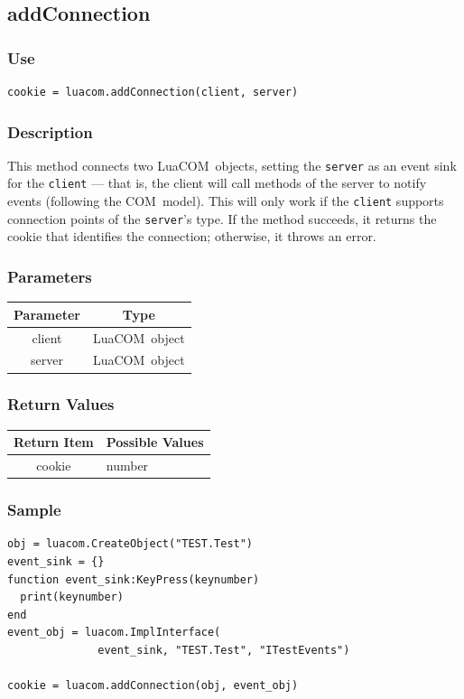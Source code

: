 \documentclass[11pt,a4paper,english]{report}
\newcommand{\ident}[1]{\mbox{\texttt{#1}}}
\newcommand{\techname}[1]{\mbox{#1}}
\newcommand{\com}{\techname{COM}}
\newcommand{\luacom}{\techname{LuaCOM}}
\begin{document}
\subsection*{addConnection}

\subsubsection*{Use}

\begin{verbatim}
cookie = luacom.addConnection(client, server)
\end{verbatim}

\subsubsection*{Description}
This method connects two \luacom\ objects, setting the
\ident{server} as an event sink for the \ident{client} --- that is, the
client will call methods of the server to notify events (following the
\com\ model). This will only work if the \ident{client} supports
connection points of the \ident{server}'s type. If the method
succeeds, it returns the cookie that identifies the connection;
otherwise, it throws an error.

\subsubsection*{Parameters}

\begin{tabular}{|c|c|}
\hline
\bf Parameter & \bf Type  \\ \hline \hline
client & \luacom\ object  \\ \hline
server & \luacom\ object  \\ \hline
\end{tabular}

\subsubsection*{Return Values}

\begin{tabular}{|c|p{4cm}|}
\hline
\bf Return Item & \bf Possible Values \\ \hline \hline
cookie  & number \\ \hline
\end{tabular}

\subsubsection*{Sample}
\begin{verbatim}
obj = luacom.CreateObject("TEST.Test")
event_sink = {}
function event_sink:KeyPress(keynumber)
  print(keynumber)
end
event_obj = luacom.ImplInterface(
              event_sink, "TEST.Test", "ITestEvents")

cookie = luacom.addConnection(obj, event_obj)
\end{verbatim}
\end{document}
